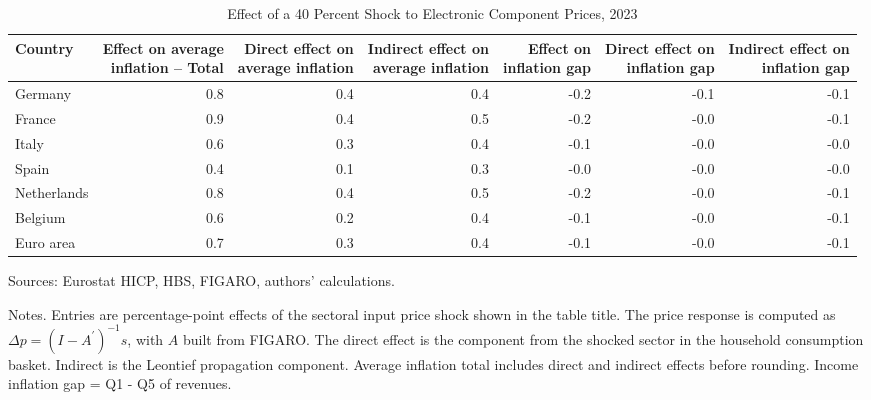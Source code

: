 \documentclass[11pt]{article}
\begin{document}
\begin{table}[H]
\centering
\caption{Effect of a 40 Percent Shock to Electronic Component Prices, 2023}
\scriptsize
\setlength{\tabcolsep}{4.2pt}
\begin{tabular}{lrrrrrr}
\toprule
Country & \shortstack{Effect on average\\inflation -- Total} & \shortstack{Direct effect on\\average inflation} & \shortstack{Indirect effect on\\average inflation} & \shortstack{Effect on\\inflation gap} & \shortstack{Direct effect on\\inflation gap} & \shortstack{Indirect effect on\\inflation gap}
 \\
\midrule
Germany & 0.8 & 0.4 & 0.4 & -0.2 & -0.1 & -0.1
 \\
France & 0.9 & 0.4 & 0.5 & -0.2 & -0.0 & -0.1
 \\
Italy & 0.6 & 0.3 & 0.4 & -0.1 & -0.0 & -0.0
 \\
Spain & 0.4 & 0.1 & 0.3 & -0.0 & -0.0 & -0.0
 \\
Netherlands & 0.8 & 0.4 & 0.5 & -0.2 & -0.0 & -0.1
 \\
Belgium & 0.6 & 0.2 & 0.4 & -0.1 & -0.0 & -0.1
 \\
Euro area & 0.7 & 0.3 & 0.4 & -0.1 & -0.0 & -0.1
 \\
\bottomrule
\end{tabular}
\par\vspace{0.35em}\footnotesize\noindent Sources: Eurostat HICP, HBS, FIGARO, authors' calculations.
\par\vspace{0.25em}\footnotesize\noindent Notes. Entries are percentage-point effects of the sectoral input price shock shown in the table title. The price response is computed as $\Delta p = (I - A^{\prime})^{-1}s$, with $A$ built from FIGARO. The direct effect is the component from the shocked sector in the household consumption basket. Indirect is the Leontief propagation component. Average inflation total includes direct and indirect effects before rounding. Income inflation gap = Q1 - Q5 of revenues.
\end{table}
\vspace{0.6em}
\end{document}
